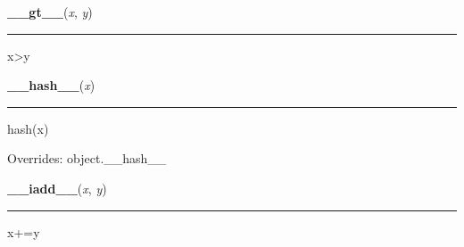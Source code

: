     \label{list:__gt__}

    \vspace{0.5ex}

    \begin{boxedminipage}{\textwidth}

    \raggedright \textbf{\_\_gt\_\_}(\textit{x}, \textit{y})

    \vspace{-1.5ex}

    \rule{\textwidth}{0.5\fboxrule}

x{\textgreater}y
    \vspace{1ex}

    \end{boxedminipage}

    \vspace{0.5ex}

    \begin{boxedminipage}{\textwidth}

    \raggedright \textbf{\_\_hash\_\_}(\textit{x})

    \vspace{-1.5ex}

    \rule{\textwidth}{0.5\fboxrule}

hash(x)
    \vspace{1ex}

      Overrides: object.\_\_hash\_\_

    \end{boxedminipage}

    \label{list:__iadd__}

    \vspace{0.5ex}

    \begin{boxedminipage}{\textwidth}

    \raggedright \textbf{\_\_iadd\_\_}(\textit{x}, \textit{y})

    \vspace{-1.5ex}

    \rule{\textwidth}{0.5\fboxrule}

x+=y
    \vspace{1ex}

    \end{boxedminipage}

    \label{list:__imul__}

    \vspace{0.5ex}

